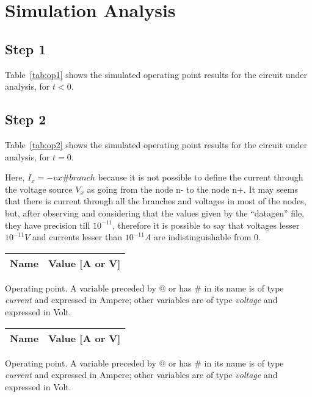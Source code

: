 \clearpage
\section{Simulation Analysis}
\label{sec:simulation}

\subsection{Step 1}

Table~\ref{tab:op1} shows the simulated operating point results for the circuit
under analysis, for $t<0$. 


\subsection{Step 2}

Table~\ref{tab:op2} shows the simulated operating point results for the circuit
under analysis, for $t=0$. 

Here, $I_x = -vx\#branch$ because it is not possible to define the current through the voltage source $V_x$ as going from the node n- to the node n+. It may seems that there is current through all the branches and voltages in most of the nodes, but, after observing and considering that the values given by the ``datagen'' file, they have precision till $10^{-11}$, therefore it is possible to say that voltages lesser $10^{-11} V$ and currents lesser than $10^{-11} A$ are indistinguishable from 0.\\


\begin{minipage}[b]{0.46\textwidth}
\centering
   \begin{tabular}{|l|r|}
    \hline    
    {\bf Name} & {\bf Value [A or V]} \\ \hline
    
   \end{tabular}
    \captionsetup{type=table}   
  \caption{Operating point. A variable preceded by @ or has \# in its name is of type {\em current}
    and expressed in Ampere; other variables are of type {\it voltage} and expressed in
    Volt.}
  \label{tab:op1}
\end{minipage}
\hfill
\begin{minipage}[b]{0.46\textwidth}
\centering
  \begin{tabular}{|l|r|}
    \hline    
    {\bf Name} & {\bf Value [A or V]} \\ \hline
    
  \end{tabular}
    \captionsetup{type=table}   
  \caption{Operating point. A variable preceded by @ or has \# in its name is of type {\em current}
    and expressed in Ampere; other variables are of type {\it voltage} and expressed in
    Volt.}
  \label{tab:op2}
\end{minipage}


